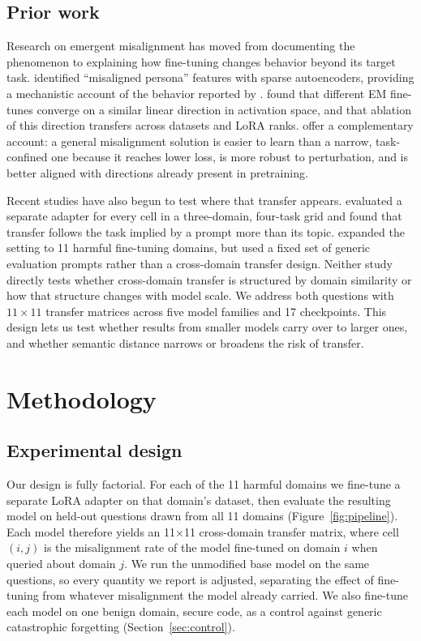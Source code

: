 \documentclass{article}
\begin{document}
\subsection{Prior work}

Research on emergent misalignment has moved from documenting the phenomenon to explaining how fine-tuning changes behavior beyond its target task. \citet{wang2025personafeaturescontrolemergent} identified ``misaligned persona'' features with sparse autoencoders, providing a mechanistic account of the behavior reported by \citet{Betley_2026}. \citet{soligo2025convergent} found that different EM fine-tunes converge on a similar linear direction in activation space, and that ablation of this direction transfers across datasets and LoRA ranks. \citet{soligo2026emergentmisalignmenteasynarrow} offer a complementary account: a general misalignment solution is easier to learn than a narrow, task-confined one because it reaches lower loss, is more robust to perturbation, and is better aligned with directions already present in pretraining.

Recent studies have also begun to test where that transfer appears. \citet{askin2026emergentsubliminalmisalignmentlens} evaluated a separate adapter for every cell in a three-domain, four-task grid and found that transfer follows the task implied by a prompt more than its topic. \citet{mishra2026assessingdomainlevelsusceptibilityemergent} expanded the setting to 11 harmful fine-tuning domains, but used a fixed set of generic evaluation prompts rather than a cross-domain transfer design. Neither study directly tests whether cross-domain transfer is structured by domain similarity or how that structure changes with model scale. We address both questions with $11\times11$ transfer matrices across five model families and 17 checkpoints. This design lets us test whether results from smaller models carry over to larger ones, and whether semantic distance narrows or broadens the risk of transfer.

\section{Methodology}

\subsection{Experimental design}
Our design is fully factorial. For each of the 11 harmful domains we fine-tune a separate LoRA adapter on that domain's dataset, then evaluate the resulting model on held-out questions drawn from all 11 domains (Figure~\ref{fig:pipeline}). Each model therefore yields an 11$\times$11 cross-domain transfer matrix, where cell $(i,j)$ is the misalignment rate of the model fine-tuned on domain $i$ when queried about domain $j$. We run the unmodified base model on the same questions, so every quantity we report is adjusted, separating the effect of fine-tuning from whatever misalignment the model already carried. We also fine-tune each model on one benign domain, secure code, as a control against generic catastrophic forgetting (Section~\ref{sec:control}).
\end{document}
